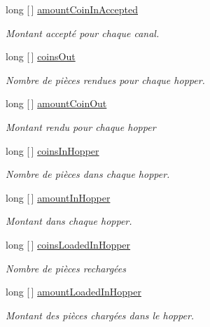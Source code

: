 \begin{DoxyCompactItemize}
long \mbox{[}$\,$\mbox{]} \mbox{\hyperlink{class_device_library_1_1_ccoins_counters_af660ed03f005088af19e254c486f3c70}{amount\+Coin\+In\+Accepted}}
\begin{DoxyCompactList}\small\item\em Montant accepté pour chaque canal. \end{DoxyCompactList}\item 
long \mbox{[}$\,$\mbox{]} \mbox{\hyperlink{class_device_library_1_1_ccoins_counters_ac4511e46f131ca0850740547325aef5b}{coins\+Out}}
\begin{DoxyCompactList}\small\item\em Nombre de pièces rendues pour chaque hopper. \end{DoxyCompactList}\item 
long \mbox{[}$\,$\mbox{]} \mbox{\hyperlink{class_device_library_1_1_ccoins_counters_ad67823d3af13f844edf8613c35159c0c}{amount\+Coin\+Out}}
\begin{DoxyCompactList}\small\item\em Montant rendu pour chaque hopper \end{DoxyCompactList}\item 
long \mbox{[}$\,$\mbox{]} \mbox{\hyperlink{class_device_library_1_1_ccoins_counters_a7e5058caf13293a4622949c84f6e46de}{coins\+In\+Hopper}}
\begin{DoxyCompactList}\small\item\em Nombre de pièces dans chaque hopper. \end{DoxyCompactList}\item 
long \mbox{[}$\,$\mbox{]} \mbox{\hyperlink{class_device_library_1_1_ccoins_counters_a0b3b1b972743bade9c94aa02d83ca68d}{amount\+In\+Hopper}}
\begin{DoxyCompactList}\small\item\em Montant dans chaque hopper. \end{DoxyCompactList}\item 
long \mbox{[}$\,$\mbox{]} \mbox{\hyperlink{class_device_library_1_1_ccoins_counters_a8e83e083de56931f9827ea2a818a802f}{coins\+Loaded\+In\+Hopper}}
\begin{DoxyCompactList}\small\item\em Nombre de pièces rechargées \end{DoxyCompactList}\item 
long \mbox{[}$\,$\mbox{]} \mbox{\hyperlink{class_device_library_1_1_ccoins_counters_ad0e988acb40f8280e3f5232872d88d7d}{amount\+Loaded\+In\+Hopper}}
\begin{DoxyCompactList}\small\item\em Montant des pièces chargées dans le hopper. \end{DoxyCompactList}\end{DoxyCompactItemize}


